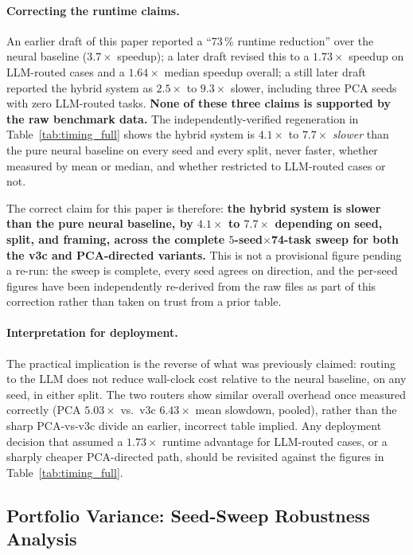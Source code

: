 \documentclass[twoside,11pt]{article}
\begin{document}
\paragraph{Correcting the runtime claims.}
\label{sec:correction}

An earlier draft of this paper reported a ``73\,\% runtime reduction'' over
the neural baseline ($3.7\times$ speedup); a later draft revised this to a
$1.73\times$ speedup on LLM-routed cases and a $1.64\times$ median speedup
overall; a still later draft reported the hybrid system as $2.5\times$ to
$9.3\times$ slower, including three PCA seeds with zero LLM-routed tasks.
\textbf{None of these three claims is supported by the raw benchmark
data.} The independently-verified regeneration in Table~\ref{tab:timing_full}
shows the hybrid system is $4.1\times$ to $7.7\times$ \emph{slower} than
the pure neural baseline on every seed and every split, never faster,
whether measured by mean or median, and whether restricted to LLM-routed
cases or not.

The correct claim for this paper is therefore: \textbf{the hybrid system
is slower than the pure neural baseline, by $4.1\times$ to $7.7\times$
depending on seed, split, and framing, across the complete
$5$-seed$\times$74-task sweep for both the v3c and PCA-directed
variants.} This is not a provisional figure pending a re-run: the sweep
is complete, every seed agrees on direction, and the per-seed figures
have been independently re-derived from the raw files as part of this
correction rather than taken on trust from a prior table.

\paragraph{Interpretation for deployment.}
The practical implication is the reverse of what was previously claimed:
routing to the LLM does not reduce wall-clock cost relative to the neural
baseline, on any seed, in either split. The two routers show similar
overall overhead once measured correctly (PCA $5.03\times$ vs.\ v3c
$6.43\times$ mean slowdown, pooled), rather than the sharp PCA-vs-v3c
divide an earlier, incorrect table implied. Any deployment decision that
assumed a $1.73\times$ runtime advantage for LLM-routed cases, or a
sharply cheaper PCA-directed path, should be revisited against the
figures in Table~\ref{tab:timing_full}.


\subsection{Portfolio Variance: Seed-Sweep Robustness Analysis}\label{subsec:portfolio-variance-seedsweep-robustness-}
\label{sec:portfolio_seed_sweep}
\end{document}

